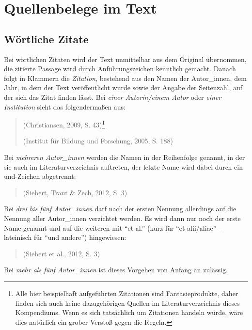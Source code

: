 \documentclass[ngerman,oneside,12pt,a4paper]{scrbook}
\begin{document}
\section{Quellenbelege im Text}\label{quellenbelege-im-text}

\subsection{Wörtliche Zitate}\label{wortliche-zitate}

Bei wörtlichen Zitaten wird der Text unmittelbar aus dem Original
übernommen, die zitierte Passage wird durch Anführungszeichen kenntlich
gemacht. Danach folgt in Klammern die \emph{Zitation}, bestehend aus den
Namen der Autor\_innen, dem Jahr, in dem der Text veröffentlicht wurde
sowie der Angabe der Seitenzahl, auf der sich das Zitat finden lässt.
Bei \emph{einer Autorin/einem Autor} oder \emph{einer Institution} sieht
das folgendermaßen aus:

\begin{quote}
(Christiansen, 2009, S. 43)\footnote{Alle hier beispielhaft aufgeführten
  Zitationen sind Fantasieprodukte, daher finden sich auch keine
  dazugehörigen Quellen im Literaturverzeichnis dieses Kompendiums. Wenn
  es sich tatsächlich um Zitationen handeln würde, wäre dies natürlich
  ein grober Verstoß gegen die Regeln.}

(Institut für Bildung und Forschung, 2005, S. 188)
\end{quote}

Bei \emph{mehreren Autor\_innen} werden die Namen in der Reihenfolge
genannt, in der sie auch im Literaturverzeichnis auftreten, der letzte
Name wird dabei durch ein und-Zeichen abgetrennt:

\begin{quote}
(Siebert, Traut \& Zech, 2012, S. 3)
\end{quote}

Bei \emph{drei bis fünf Autor\_innen} darf nach der ersten Nennung
allerdings auf die Nennung aller Autor\_innen verzichtet werden. Es wird
dann nur noch der erste Name genannt und auf die weiteren mit
\enquote{et al.} (kurz für \enquote{et alii/aliae} -- lateinisch für
\enquote{und andere}) hingewiesen:

\begin{quote}
(Siebert et al., 2012, S. 3)
\end{quote}

Bei \emph{mehr als fünf Autor\_innen} ist dieses Vorgehen von Anfang an
zulässig.
\end{document}
